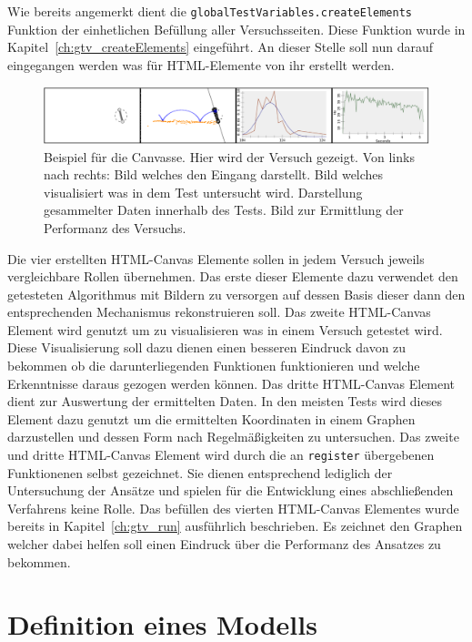 Wie bereits angemerkt dient die \lstinline{globalTestVariables.createElements} Funktion der einhetlichen Befüllung aller Versuchsseiten.
Diese Funktion wurde in Kapitel~\ref{ch:gtv_createElements} eingeführt.
An dieser Stelle soll nun darauf eingegangen werden was für HTML-Elemente von ihr erstellt werden.

\begin{figure}
    \includegraphics[width=\textwidth]{gfx/canvasses.png}
    \caption[Bild der Canvasse]{Beispiel für die Canvasse. Hier wird der Versuch  gezeigt. Von links nach rechts: Bild welches den Eingang darstellt. Bild welches visualisiert was in dem Test untersucht wird. Darstellung gesammelter Daten innerhalb des Tests. Bild zur Ermittlung der Performanz des Versuchs.}\label{fig:canvasses}
\end{figure}


Die vier erstellten HTML-Canvas Elemente sollen in jedem Versuch jeweils vergleichbare Rollen übernehmen.
Das erste dieser Elemente dazu verwendet den getesteten Algorithmus mit Bildern zu versorgen auf dessen Basis dieser dann den entsprechenden Mechanismus rekonstruieren soll.
Das zweite HTML-Canvas Element wird genutzt um zu visualisieren was in einem Versuch getestet wird.
Diese Visualisierung soll dazu dienen einen besseren Eindruck davon zu bekommen ob die darunterliegenden Funktionen funktionieren und welche Erkenntnisse daraus gezogen werden können.
Das dritte HTML-Canvas Element dient zur Auswertung der ermittelten Daten.
In den meisten Tests wird dieses Element dazu genutzt um die ermittelten Koordinaten in einem Graphen darzustellen und dessen Form nach Regelmä{\ss}igkeiten zu untersuchen.
Das zweite und dritte HTML-Canvas Element wird durch die an \lstinline{register} übergebenen Funktionenen selbst gezeichnet.
Sie dienen entsprechend lediglich der Untersuchung der Ansätze und spielen für die Entwicklung eines abschlie{\ss}enden Verfahrens keine Rolle.
Das befüllen des vierten HTML-Canvas Elementes wurde bereits in Kapitel~\ref{ch:gtv_run} ausführlich beschrieben.
Es zeichnet den Graphen welcher dabei helfen soll einen Eindruck über die Performanz des Ansatzes zu bekommen.

\section{Definition eines  Modells}

